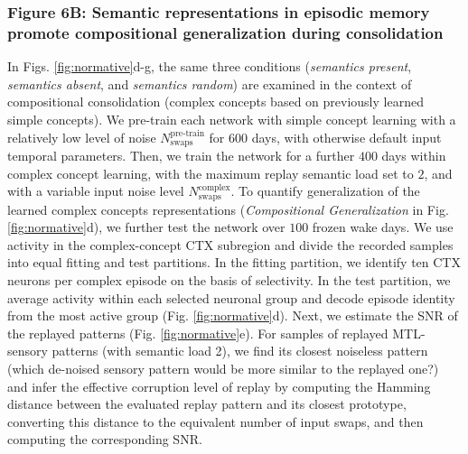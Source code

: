 \documentclass{article}
\begin{document}
\subsubsection*{Figure 6B: Semantic representations in episodic memory promote compositional generalization during consolidation}
In Figs. \ref{fig:normative}d-g, the same three conditions (\textit{semantics present}, \textit{semantics absent}, and \textit{semantics random}) are examined in the context of compositional consolidation (complex concepts based on previously learned simple concepts). We pre-train each network with simple concept learning with a relatively low level of noise $N_\textrm{swaps}^\textrm{pre-train}$ for 600 days, with otherwise default input temporal parameters. Then,  we train the network for a further $400$ days within complex concept learning, with the maximum replay semantic load set to $2$, and with a variable input noise level $N_\textrm{swaps}^\textrm{complex}$.
\newline\newline
To quantify generalization of the learned complex concepts representations (\textit{Compositional Generalization} in Fig. \ref{fig:normative}d), we further test the network over $100$ frozen wake days. We use activity in the complex-concept CTX subregion and divide the recorded samples into equal fitting and test partitions. In the fitting partition, we identify ten CTX neurons per complex episode on the basis of selectivity. In the test partition, we average activity within each selected neuronal group and decode episode identity from the most active group (Fig. \ref{fig:normative}d).
\newline\newline
Next, we estimate the SNR of the replayed patterns (Fig. \ref{fig:normative}e). For samples of replayed MTL-sensory patterns (with semantic load 2), we find its closest noiseless pattern (which de-noised sensory pattern would be more similar to the replayed one?) and infer the effective corruption level of replay by computing the Hamming distance between the evaluated replay pattern and its closest prototype, converting this distance to the equivalent number of input swaps, and then computing the corresponding SNR.
\newline\newline
\end{document}
